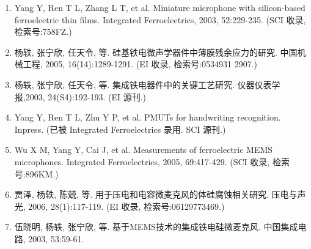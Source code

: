 

\begin{paper}
\begin{enumerate}
	\item Yang Y, Ren T L, Zhang L T, et al. Miniature microphone with silicon-based ferroelectric thin films. Integrated Ferroelectrics, 2003, 52:229-235. (SCI 收录, 检索号:758FZ.)
	\item 杨轶, 张宁欣, 任天令, 等. 硅基铁电微声学器件中薄膜残余应力的研究. 中国机械工程, 2005, 16(14):1289-1291. (EI 收录, 检索号:0534931 2907.)
	\item 杨轶, 张宁欣, 任天令, 等. 集成铁电器件中的关键工艺研究. 仪器仪表学报,2003, 24(S4):192-193. (EI 源刊.)
	\item Yang Y, Ren T L, Zhu Y P, et al. PMUTs for handwriting recognition. Inpress. (已被 Integrated Ferroelectrics 录用. SCI 源刊.)
	\item Wu X M, Yang Y, Cai J, et al. Measurements of ferroelectric MEMS microphones. Integrated Ferroelectrics, 2005, 69:417-429. (SCI 收录, 检索号:896KM.)
	\item 贾泽, 杨轶, 陈兢, 等. 用于压电和电容微麦克风的体硅腐蚀相关研究. 压电与声光, 2006, 28(1):117-119. (EI 收录, 检索号:06129773469.)
	\item 伍晓明, 杨轶, 张宁欣, 等. 基于MEMS技术的集成铁电硅微麦克风. 中国集成电路, 2003, 53:59-61.
\end{enumerate}
\end{paper}
